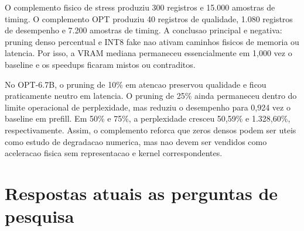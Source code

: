 O complemento fisico de stress produziu 300 registros e 15.000 amostras de
timing. O complemento OPT produziu 40 registros de qualidade, 1.080 registros
de desempenho e 7.200 amostras de timing. A conclusao principal e negativa:
pruning denso percentual e INT8 fake nao ativam caminhos fisicos de memoria ou
latencia. Por isso, a VRAM mediana permaneceu essencialmente em 1,000 vez o
baseline e os speedups ficaram mistos ou contraditos.

\begin{center}
\end{center}

No OPT-6.7B, o pruning de 10\% em atencao preservou qualidade e ficou
praticamente neutro em latencia. O pruning de 25\% ainda permaneceu dentro do
limite operacional de perplexidade, mas reduziu o desempenho para 0,924 vez o
baseline em prefill. Em 50\% e 75\%, a perplexidade cresceu 50,59\% e
1.328,60\%, respectivamente. Assim, o complemento reforca que zeros densos
podem ser uteis como estudo de degradacao numerica, mas nao devem ser vendidos
como aceleracao fisica sem representacao e kernel correspondentes.

\section{Respostas atuais as perguntas de pesquisa}

